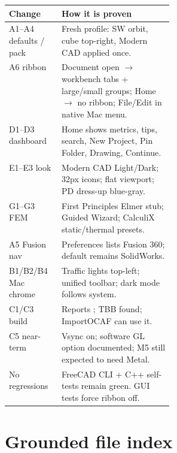 \documentclass[11pt]{article}
\newcommand{\fp}[1]{\texttt{\detokenize{#1}}}
\begin{document}
\noindent\begin{tabularx}{\linewidth}{@{}p{0.32\linewidth}L@{}}
\toprule
\textbf{Change} & \textbf{How it is proven} \\
\midrule
A1--A4 defaults / pack & Fresh profile: SW orbit, cube top-right, Modern CAD applied once. \\
A6 ribbon & Document open $\rightarrow$ workbench tabs + large/small groups; Home $\rightarrow$ no ribbon; File/Edit in native Mac menu. \\
D1--D3 dashboard & Home shows metrics, tips, search, New Project, Pin Folder, Drawing, Continue. \\
E1--E3 look & Modern CAD Light/Dark; 32px icons; flat viewport; PD dress-up blue-gray. \\
G1--G3 FEM & First Principles Elmer stub; Guided Wizard; CalculiX static/thermal presets. \\
A5 Fusion nav & Preferences lists Fusion 360; default remains SolidWorks. \\
B1/B2/B4 Mac chrome & Traffic lights top-left; unified toolbar; dark mode follows system. \\
C1/C3 build & Reports \fp{arm64}; TBB found; ImportOCAF can use it. \\
C5 near-term & Vsync on; software GL option documented; M5 still expected to need Metal. \\
No regressions & FreeCAD CLI + C++ self-tests remain green. GUI tests force ribbon off. \\
\bottomrule
\end{tabularx}

\section{Grounded file index}
\end{document}
